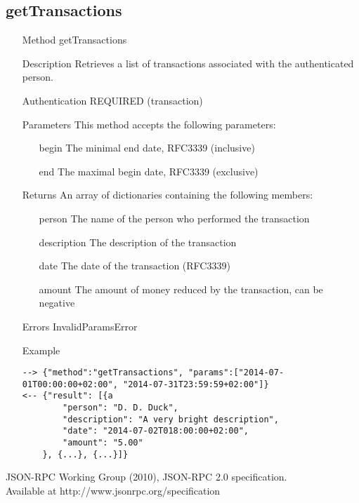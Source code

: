 \documentclass[a4paper]{scrreprt}
\begin{document}
\subsection{getTransactions}
\begin{enumerate}
\item[Method] getTransactions
\item[Description] Retrieves a list of transactions associated with the authenticated person.
\item[Authentication] REQUIRED (transaction)
\item[Parameters] This method accepts the following parameters:
\begin{enumerate}
	\item[begin] The minimal end date, RFC3339 (inclusive)
    \item[end] The maximal begin date, RFC3339 (exclusive)
    \end{enumerate}
\item[Returns] An array of dictionaries containing the following members:
\begin{enumerate}
    \item[person] The name of the person who performed the transaction
    \item[description] The description of the transaction
    \item[date] The date of the transaction (RFC3339)
    \item[amount] The amount of money reduced by the transaction, can be negative
	\end{enumerate}
\item[Errors] InvalidParamsError
\item[Example]
\begin{lstlisting}
--> {"method":"getTransactions", "params":["2014-07-01T00:00:00+02:00", "2014-07-31T23:59:59+02:00"]}
<-- {"result": [{a
        "person": "D. D. Duck",
        "description": "A very bright description",
        "date": "2014-07-02T018:00:00+02:00",
        "amount": "5.00"
    }, {...}, {...}]}
\end{lstlisting}
\end{enumerate}


\begin{thebibliography}{9}

	JSON-RPC Working Group (2010), JSON-RPC 2.0 specification.\\ Available at http://www.jsonrpc.org/specification

\end{thebibliography}
\end{document}
